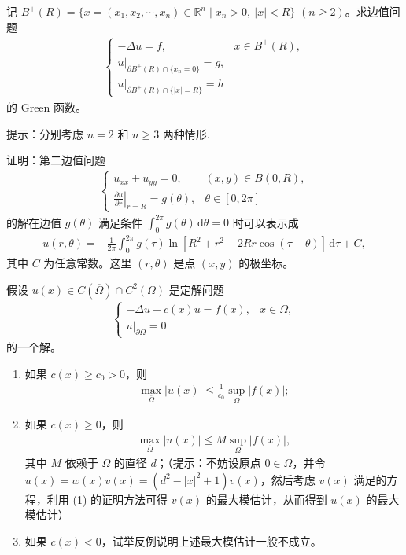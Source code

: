 \documentclass[../../main.tex]{subfiles}%
\begin{document}
\begin{example}
记 $B^+(R)=\{x=(x_1,x_2,\cdots,x_n)\in\mathbb{R}^n \mid x_n>0,\ |x|<R\}$ $(n\geqslant 2)$。求边值问题
\begin{align*}
\begin{cases}
-\Delta u = f, & x\in B^+(R), \\
u|_{\partial B^+(R)\cap\{x_n=0\}} = g, \\
u|_{\partial B^+(R)\cap\{|x|=R\}} = h
\end{cases}
\end{align*}
的 Green 函数。
\end{example}
\begin{note}
提示：分别考虑 $n=2$ 和 $n\geqslant 3$ 两种情形.
\end{note}

\begin{example}
证明：第二边值问题
\begin{align*}
\begin{cases}
u_{xx}+u_{yy}=0, & (x,y)\in B(0,R), \\
\left.\frac{\partial u}{\partial r}\right|_{r=R} = g(\theta), & \theta\in[0,2\pi]
\end{cases}
\end{align*}
的解在边值 $g(\theta)$ 满足条件 $\int_0^{2\pi}g(\theta)\,\mathrm{d}\theta=0$ 时可以表示成
\begin{align*}
u(r,\theta) = -\frac{1}{2\pi}\int_0^{2\pi} g(\tau) \ln\left[R^2+r^2-2Rr\cos(\tau-\theta)\right]\,\mathrm{d}\tau + C,
\end{align*}
其中 $C$ 为任意常数。这里 $(r,\theta)$ 是点 $(x,y)$ 的极坐标。
\end{example}

\begin{example}
假设 $u(x)\in C(\overline{\Omega})\cap C^2(\Omega)$ 是定解问题
\begin{align*}
\begin{cases}
-\Delta u + c(x)u = f(x), & x\in\Omega, \\
u|_{\partial\Omega} = 0
\end{cases}
\end{align*}
的一个解。
\begin{enumerate}[(1)]
\item 如果 $c(x)\geqslant c_0>0$，则
\begin{align*}
\max_{\overline{\Omega}} |u(x)| \leqslant \frac{1}{c_0}\sup_{\Omega}|f(x)|;
\end{align*}
\item 如果 $c(x)\geqslant 0$，则
\begin{align*}
\max_{\overline{\Omega}} |u(x)| \leqslant M\sup_{\Omega}|f(x)|,
\end{align*}
其中 $M$ 依赖于 $\Omega$ 的直径 $d$；（提示：不妨设原点 $0\in\Omega$，并令 $u(x)=w(x)v(x)=(d^2-|x|^2+1)v(x)$，然后考虑 $v(x)$ 满足的方程，利用 (1) 的证明方法可得 $v(x)$ 的最大模估计，从而得到 $u(x)$ 的最大模估计）
\item 如果 $c(x)<0$，试举反例说明上述最大模估计一般不成立。
\end{enumerate}
\end{example}
\end{document}
